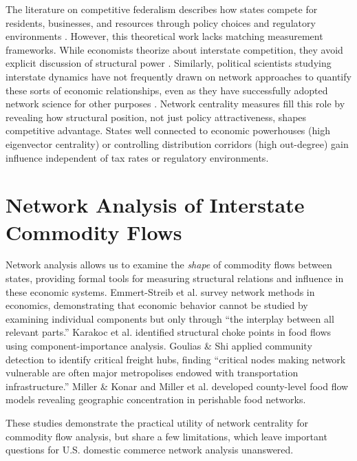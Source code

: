 \documentclass[12pt,oneside]{book}
\begin{document}
The literature on competitive federalism describes how states compete for residents, businesses, and resources through policy choices and regulatory environments \cite{weingast_economic_1995, greve_state_nodate, lemke_interjurisdictional_2016}. However, this theoretical work lacks matching measurement frameworks. While economists theorize about interstate competition, they avoid explicit discussion of structural power \cite{deaton_rethinking_2024}. Similarly, political scientists studying interstate dynamics have not frequently drawn on network approaches to quantify these sorts of economic relationships, even as they have successfully adopted network science for other purposes \cite{ward_network_2011}. Network centrality measures fill this role by revealing how structural position, not just policy attractiveness, shapes competitive advantage. States well connected to economic powerhouses (high eigenvector centrality) or controlling distribution corridors (high out-degree) gain influence independent of tax rates or regulatory environments. 

\section{Network Analysis of Interstate Commodity Flows}
Network analysis allows us to examine the \textit{shape} of commodity flows between states, providing formal tools for measuring structural relations and influence in these economic systems. Emmert-Streib et al. \cite{emmert-streib_understanding_2018} survey network methods in economics, demonstrating that economic behavior cannot be studied by examining individual components but only through ``the interplay between all relevant parts.'' Karakoc et al. \cite{karakoc_structural_2023} identified structural choke points in food flows using component-importance analysis. Goulias \& Shi \cite{goulias_complex_2024} applied community detection to identify critical freight hubs, finding ``critical nodes making network vulnerable are often major metropolises endowed with transportation infrastructure.'' Miller \& Konar \cite{miller_us_2024} and Miller et al. \cite{miller_network_2025} developed county-level food flow models revealing geographic concentration in perishable food networks.

These studies demonstrate the practical utility of network centrality for commodity flow analysis, but share a few limitations, which leave important questions for U.S. domestic commerce network analysis unanswered.
\end{document}
